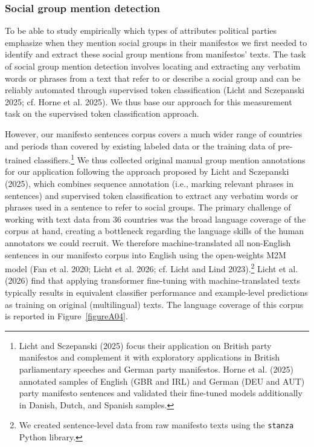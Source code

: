 \documentclass[12pt]{article}
\begin{document}
\subsubsection{Social group mention detection}\label{social-group-mention-detection}

To be able to study empirically which types of attributes political parties emphasize when they mention social groups in their manifestos we first needed to identify and extract these social group mentions from manifestos' texts.
The task of social group mention detection involves locating and extracting any verbatim words or phrases from a text that refer to or describe a social group and can be reliably automated through supervised token classification (Licht and Sczepanski 2025; cf. Horne et al. 2025).
We thus base our approach for this measurement task on the supervised token classification approach.

However, our manifesto sentences corpus covers a much wider range of countries and periods than covered by existing labeled data or the training data of pre-trained classifiers.\footnote{
  Licht and Sczepanski (2025) focus their application on British party manifestos and complement it with exploratory applications in British parliamentary speeches and German party manifestos.
  Horne et al. (2025) annotated samples of English (GBR and IRL) and German (DEU and AUT) party manifesto sentences and validated their fine-tuned models additionally in Danish, Dutch, and Spanish samples.
}
We thus collected original manual group mention annotations for our application following the approach proposed by Licht and Sczepanski (2025), which combines sequence annotation (i.e., marking relevant phrases in sentences) and supervised token classification to extract any verbatim words or phrases used in a sentence to refer to social groups.
The primary challenge of working with text data from 36 countries was the broad language coverage of the corpus at hand, creating a bottleneck regarding the language skills of the human annotators we could recruit.
We therefore machine-translated all non-English sentences in our manifesto corpus into English using the open-weights M2M model (Fan et al. 2020; Licht et al. 2026; cf. Licht and Lind 2023).\footnote{We created sentence-level data from raw manifesto texts using the \texttt{stanza} Python library.}
Licht et al. (2026) find that applying transformer fine-tuning with machine-translated texts typically results in equivalent classifier performance and example-level predictions as training on original (multilingual) texts.
The language coverage of this corpus is reported in Figure~\ref{figureA04}.
\end{document}
